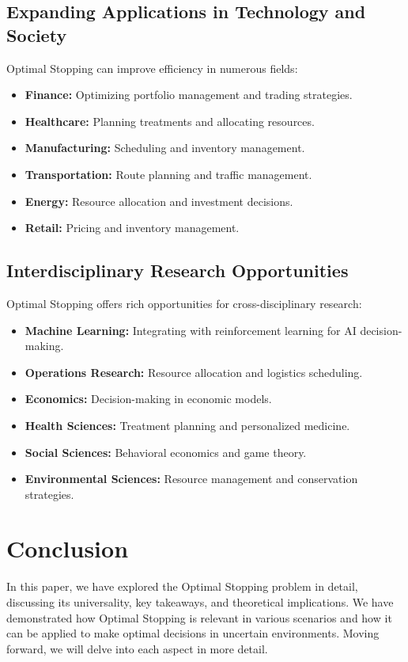 \documentclass[12pt]{book} %
\begin{document}
\subsection{Expanding Applications in Technology and Society}

Optimal Stopping can improve efficiency in numerous fields:

\begin{itemize}
    \item \textbf{Finance:} Optimizing portfolio management and trading strategies.
    \item \textbf{Healthcare:} Planning treatments and allocating resources.
    \item \textbf{Manufacturing:} Scheduling and inventory management.
    \item \textbf{Transportation:} Route planning and traffic management.
    \item \textbf{Energy:} Resource allocation and investment decisions.
    \item \textbf{Retail:} Pricing and inventory management.
\end{itemize}

\subsection{Interdisciplinary Research Opportunities}

Optimal Stopping offers rich opportunities for cross-disciplinary research:

\begin{itemize}
    \item \textbf{Machine Learning:} Integrating with reinforcement learning for AI decision-making.
    \item \textbf{Operations Research:} Resource allocation and logistics scheduling.
    \item \textbf{Economics:} Decision-making in economic models.
    \item \textbf{Health Sciences:} Treatment planning and personalized medicine.
    \item \textbf{Social Sciences:} Behavioral economics and game theory.
    \item \textbf{Environmental Sciences:} Resource management and conservation strategies.
\end{itemize}

\section{Conclusion}
In this paper, we have explored the Optimal Stopping problem in detail, discussing its universality, key takeaways, and theoretical implications. We have demonstrated how Optimal Stopping is relevant in various scenarios and how it can be applied to make optimal decisions in uncertain environments. Moving forward, we will delve into each aspect in more detail.
\end{document}
